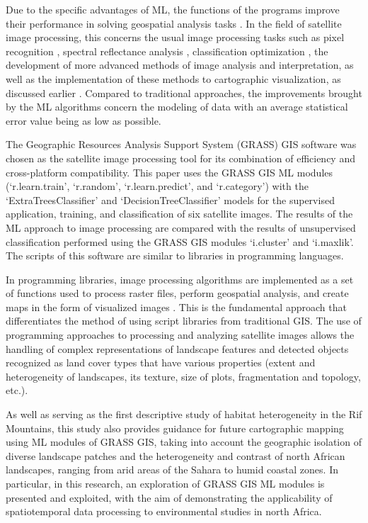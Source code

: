 \documentclass[geomatics,article,accept,pdftex,oneauthor]{Definitions/mdpi}
\begin{document}
Due to the specific advantages of ML, the functions of the programs improve their performance in solving geospatial analysis tasks \cite{More02072020,Lemenkova202403,GarciaPedrero03042017}. In the field of satellite image processing, this concerns the usual image processing tasks such as pixel recognition \cite{NASIRI2023103555,EBRAHIMY2023103390}, spectral reflectance analysis \cite{FU2024104421}, classification optimization \cite{PADHY2024100278,Lemenkova202401}, the development of more advanced methods of image analysis and interpretation, as well as the implementation of these methods to cartographic visualization, as discussed earlier \cite{HABIB20231,Lemenkova202406,KHALDI2024104191}. Compared to traditional approaches, the improvements brought by the ML algorithms concern the modeling of data with an average statistical error value %
 being as low as possible.

The Geographic Resources Analysis Support System (GRASS) GIS software was chosen as the satellite image processing tool for its combination of efficiency and cross-platform compatibility. This paper uses the GRASS GIS ML modules (`r.learn.train', `r.random', `r.learn.predict', and `r.category') with the `ExtraTreesClassifier' and `DecisionTreeClassifier' models for the supervised application, training, and classification of six satellite images. The results of the ML approach to image processing are compared with the results of unsupervised classification performed using the GRASS GIS modules `i.cluster' and `i.maxlik'. The scripts of this software are similar to libraries in programming languages.

In programming libraries, image processing algorithms are implemented as a set of functions used to process raster files, perform geospatial analysis, and create maps in the form of visualized images \cite{Lemenkova202227,PEREIRA2023106653,ESKANDARI2024}. This is the fundamental approach that differentiates the method of using script libraries from traditional GIS. The use of programming approaches to processing and analyzing satellite images allows the handling of complex representations of landscape features and detected objects recognized as land cover types that have various properties (extent and heterogeneity of landscapes, its texture, size of plots, fragmentation and topology, etc.).

As well as serving as the first descriptive study of habitat heterogeneity in the Rif Mountains, this study also provides guidance for future cartographic mapping using ML modules of GRASS GIS, taking into account the geographic isolation of diverse landscape patches and the heterogeneity and contrast of north African landscapes, ranging from arid areas of the Sahara to humid coastal zones. In particular, in this research, an exploration of GRASS GIS ML modules is presented and exploited, with the aim of demonstrating the applicability of spatiotemporal data processing to environmental studies in north Africa.
\end{document}
